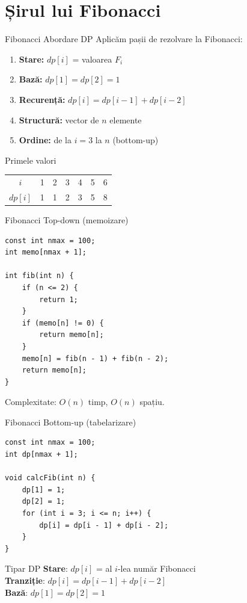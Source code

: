 \documentclass{beamer}
\begin{document}
\section{Șirul lui Fibonacci}

\begin{frame}{Fibonacci \textemdash{} Abordare DP}
  Aplicăm pașii de rezolvare la Fibonacci:
  \begin{enumerate}\itemsep0pt
    \item \textbf{Stare:} $dp[i]$ = valoarea $F_i$
    \item \textbf{Bază:} $dp[1] = dp[2] = 1$
    \item \textbf{Recurență:} $dp[i] = dp[i-1] + dp[i-2]$
    \item \textbf{Structură:} vector de $n$ elemente
    \item \textbf{Ordine:} de la $i = 3$ la $n$ (bottom-up)
  \end{enumerate}
  \smallskip
  \begin{block}{Primele valori}
    \begin{center}
    \begin{tabular}{ccccccc}
      $i$ & 1 & 2 & 3 & 4 & 5 & 6 \\
      $dp[i]$ & 1 & 1 & 2 & 3 & 5 & 8 \\
    \end{tabular}
    \end{center}
  \end{block}
\end{frame}

\begin{frame}[fragile]{Fibonacci \textemdash{} Top-down (memoizare)}
  \begin{lstlisting}
const int nmax = 100;
int memo[nmax + 1];

int fib(int n) {
    if (n <= 2) {
        return 1;
    }
    if (memo[n] != 0) {
        return memo[n];
    }
    memo[n] = fib(n - 1) + fib(n - 2);
    return memo[n];
}
  \end{lstlisting}
  Complexitate: $O(n)$ timp, $O(n)$ spațiu.
\end{frame}

\begin{frame}[fragile]{Fibonacci \textemdash{} Bottom-up (tabelarizare)}
  \begin{lstlisting}
const int nmax = 100;
int dp[nmax + 1];

void calcFib(int n) {
    dp[1] = 1;
    dp[2] = 1;
    for (int i = 3; i <= n; i++) {
        dp[i] = dp[i - 1] + dp[i - 2];
    }
}
  \end{lstlisting}
  \begin{block}{Tipar DP}
    \textbf{Stare}: $dp[i]$ = al $i$-lea număr Fibonacci \\
    \textbf{Tranziție}: $dp[i] = dp[i-1] + dp[i-2]$ \\
    \textbf{Bază}: $dp[1] = dp[2] = 1$
  \end{block}
\end{frame}
\end{document}

